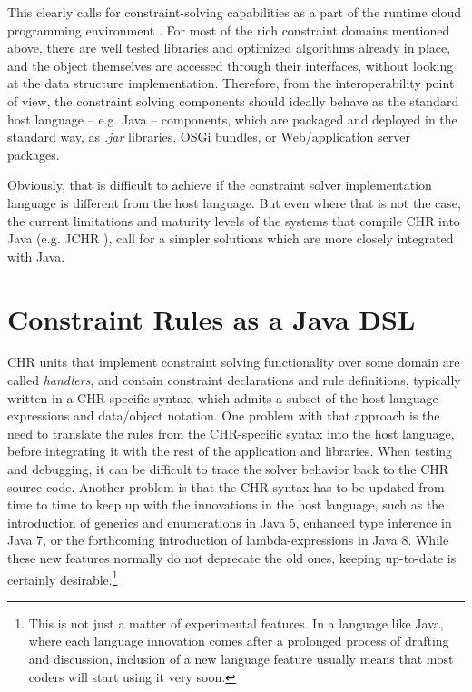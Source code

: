 \documentclass[runningheads,a4paper,11pt,dvipsname]{llncs}
\begin{document}
This clearly calls for constraint-solving capabilities as a part of
the runtime cloud programming environment
\cite{DBLP:conf/esocc/PredaGGMM12}.  
For most of the rich constraint domains mentioned above, there are
well tested libraries and optimized algorithms already in place, and
the object themselves are accessed through their interfaces, without
looking at the data structure implementation.
Therefore, from the interoperability point of view, the constraint
solving components should ideally behave as the standard host language
-- e.g. Java -- components, which are packaged and deployed in the
standard way, as \emph{.jar} libraries, OSGi
  bundles, or Web/application server packages.

Obviously, that is difficult to achieve if the constraint solver
implementation language is different from the host language.  But even
where that is not the case, the current limitations and maturity
levels of the systems that compile CHR into Java (e.g. JCHR
\cite{vanWeert+2005}), call for a simpler solutions which are more
closely integrated with Java.

\section{Constraint Rules as a Java DSL}
\label{sec:chr-as-java}

CHR units that implement constraint solving functionality over some
domain are called \emph{handlers}, and contain constraint declarations
and rule definitions, typically written in a CHR-specific syntax,
which admits a subset of the host language expressions and data/object
notation.
One problem with that approach is the need to translate the rules from
the CHR-specific syntax into the host language, before integrating it
with the rest of the application and libraries.  When testing and
debugging, it can be difficult to trace the solver behavior back to
the CHR source code.  Another problem is that the CHR syntax has to be
updated from time to time to keep up with the innovations in the host
language, such as the introduction of generics and enumerations in
Java 5, enhanced type inference in Java 7, or the forthcoming
introduction of lam\-bda-expressions in Java 8.  While these new
features normally do not deprecate the old ones, keeping up-to-date
is certainly desirable.\footnote{This is not just a matter of experimental features.  In a
  language like Java, where each language innovation comes after a
  prolonged process of drafting and discussion, inclusion of a new
  language feature usually means that most coders will start using it
  very soon.}
\end{document}
